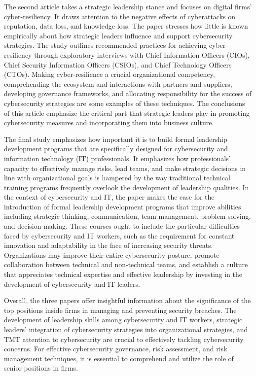 \documentclass[journal]{IEEEtran}
\begin{document}
The second article takes a strategic leadership stance and focuses on digital firms' cyber-resiliency. It draws attention to the negative effects of cyberattacks on reputation, data loss, and knowledge loss. The paper stresses how little is known empirically about how strategic leaders influence and support cybersecurity strategies. The study outlines recommended practices for achieving cyber-resiliency through exploratory interviews with Chief Information Officers (CIOs), Chief Security Information Officers (CSIOs), and Chief Technology Officers (CTOs). Making cyber-resilience a crucial organizational competency, comprehending the ecosystem and interactions with partners and suppliers, developing governance frameworks, and allocating responsibility for the success of cybersecurity strategies are some examples of these techniques. The conclusions of this article emphasize the critical part that strategic leaders play in promoting cybersecurity measures and incorporating them into business culture.

The final study emphasizes how important it is to build formal leadership development programs that are specifically designed for cybersecurity and information technology (IT) professionals. It emphasizes how professionals' capacity to effectively manage risks, lead teams, and make strategic decisions in line with organizational goals is hampered by the way traditional technical training programs frequently overlook the development of leadership qualities. In the context of cybersecurity and IT, the paper makes the case for the introduction of formal leadership development programs that improve abilities including strategic thinking, communication, team management, problem-solving, and decision-making. These courses ought to include the particular difficulties faced by cybersecurity and IT workers, such as the requirement for constant innovation and adaptability in the face of increasing security threats. Organizations may improve their entire cybersecurity posture, promote collaboration between technical and non-technical teams, and establish a culture that appreciates technical expertise and effective leadership by investing in the development of cybersecurity and IT leaders.

Overall, the three papers offer insightful information about the significance of the top positions inside firms in managing and preventing security breaches. The development of leadership skills among cybersecurity and IT workers, strategic leaders' integration of cybersecurity strategies into organizational strategies, and TMT attention to cybersecurity are crucial to effectively tackling cybersecurity concerns. For effective cybersecurity governance, risk assessment, and risk management techniques, it is essential to comprehend and utilize the role of senior positions in firms.
\end{document}
